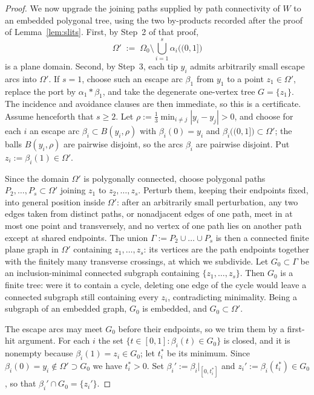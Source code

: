 \begin{proof}
We now upgrade the joining paths supplied by path connectivity of $W$ to an embedded
polygonal tree, using the two by-products recorded after the proof of
Lemma~\ref{lem:slits}. First, by Step~2 of that proof,
\[
\Omega'\;:=\;\Omega_0\setminus\bigcup_{i=1}^{s}\alpha_i\bigl((0,1]\bigr)
\]
is a plane domain. Second, by Step~3, each tip $y_i$ admits arbitrarily small escape
arcs into $\Omega'$. If $s=1$, choose such an escape arc $\beta_1$ from
$y_1$ to a point $z_1\in\Omega'$, replace the port by
$\alpha_1*\beta_1$, and take the degenerate one-vertex tree
$G=\{z_1\}$.  The incidence and avoidance clauses are then immediate, so
this is a certificate.  Assume henceforth that $s\ge2$. Let
$\rho:=\tfrac13\min_{i\neq j}|y_i-y_j|>0$, and choose for each
$i$ an escape arc $\beta_i\subset B(y_i,\rho)$ with $\beta_i(0)=y_i$ and
$\beta_i\bigl((0,1]\bigr)\subset\Omega'$; the balls $B(y_i,\rho)$ are pairwise
disjoint, so the arcs $\beta_i$ are pairwise disjoint. Put $z_i:=\beta_i(1)\in\Omega'$.

Since the domain $\Omega'$ is polygonally connected, choose polygonal paths
$P_2,\dots,P_s\subset\Omega'$ joining $z_1$ to $z_2,\dots,z_s$. Perturb them, keeping
their endpoints fixed, into general position inside $\Omega'$: after an arbitrarily
small perturbation, any two edges taken from distinct paths, or nonadjacent edges of one
path, meet in at most one point and transversely, and no vertex of one path lies on
another path except at shared endpoints. The union $\Gamma:=P_2\cup\dots\cup P_s$ is
then a connected finite plane graph in $\Omega'$ containing $z_1,\dots,z_s$: its
vertices are the path endpoints together with the finitely many transverse crossings, at
which we subdivide. Let $G_0\subset\Gamma$ be an inclusion-minimal connected subgraph
containing $\{z_1,\dots,z_s\}$. Then $G_0$ is a finite tree: were it to contain a
cycle, deleting one edge of the cycle would leave a connected subgraph still containing
every $z_i$, contradicting minimality. Being a subgraph of an embedded graph, $G_0$ is
embedded, and $G_0\subset\Omega'$.

The escape arcs may meet $G_0$ before their endpoints, so we trim them by a first-hit
argument. For each $i$ the set $\{t\in[0,1]:\beta_i(t)\in G_0\}$ is closed, and it is
nonempty because $\beta_i(1)=z_i\in G_0$; let $t_i^{*}$ be its minimum. Since
$\beta_i(0)=y_i\notin\Omega'\supset G_0$ we have $t_i^{*}>0$. Set
$\beta_i':=\beta_i|_{[0,t_i^{*}]}$ and $z_i':=\beta_i(t_i^{*})\in G_0$, so that
$\beta_i'\cap G_0=\{z_i'\}$.


\end{proof}
